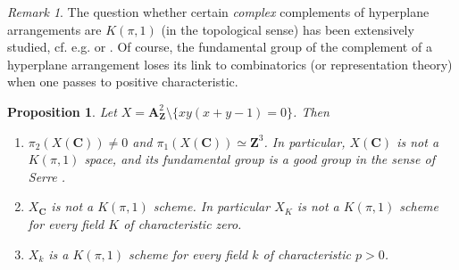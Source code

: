 \documentclass[twoside]{amsart}
\renewcommand{\AA}{\mathbf{A}}
\newcommand{\CC}{\mathbf{C}}
\newcommand{\ZZ}{\mathbf{Z}}
\newcommand{\isom}{\simeq}
\theoremstyle{plain}
\newtheorem{proposition}[subsubsection]{Proposition}
\theoremstyle{definition}
\theoremstyle{remark}
\newtheorem{remark}[subsubsection]{Remark}
\numberwithin{equation}{subsection}
\begin{document}
\begin{remark}
The question whether certain \emph{complex} complements of hyperplane arrangements are $K(\pi, 1)$ (in the topological sense) has been extensively studied, cf. e.g. \cite{Brieskorn,Deligne,Bessis} or \cite[\S 5.1]{OrlikTerao}. Of course, the fundamental group of the complement of a hyperplane arrangement loses its link to combinatorics (or representation theory) when one passes to positive characteristic. 
\end{remark}

\begin{proposition}
	Let $X = \AA^2_\ZZ \setminus \{ xy(x+y-1)=0\}$. Then
	\begin{enumerate}[(1)]
		\item $\pi_2(X(\CC))\neq 0$ and $\pi_1(X(\CC))\isom \ZZ^3$. In particular, $X(\CC)$ is not a $K(\pi, 1)$ space, and its fundamental group is a good group in the sense of Serre \cite[\S 2.6]{Serre}.
		\item $X_\CC$ is not a $K(\pi, 1)$ scheme. In particular $X_K$ is not a $K(\pi, 1)$ scheme for every field $K$ of characteristic zero.
		\item $X_k$ is a $K(\pi, 1)$ scheme for every field $k$ of characteristic $p>0$.  
	\end{enumerate}
\end{proposition}
\end{document}
